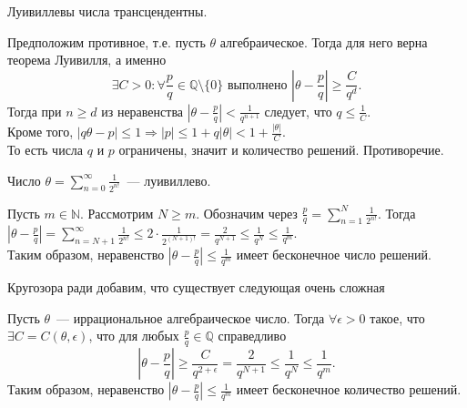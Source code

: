 \begin{proposition} \label{l9_prp}
	Луивиллевы числа трансцендентны.
\end{proposition}
\begin{pf}
	Предположим противное, т.е. пусть $\theta$ алгебраическое. Тогда для него верна теорема Луивилля, а именно
	$$\exists C > 0:  \forall  \frac{p}{q} \in \mathbb{Q} \setminus \lbrace 0 \rbrace \text{ выполнено }  \left|\theta - \frac{p}{q}\right| \geq \frac{C}{q^d}.$$
	Тогда при $n \geq d$ из неравенства $\displaystyle \left|\theta - \frac{p}{q}\right| < \frac{1}{q^{n + 1}}$ следует, что $\displaystyle q \leq \frac{1}{C}$.\\
	Кроме того, $\displaystyle \left|q \theta - p\right| \leq 1 \Rightarrow |p| \leq 1 + q|\theta| < 1 + \frac{|\theta|}{C}.$\\
	То есть числа $q$ и $p$ ограничены, значит и количество решений. Противоречие.
\end{pf}

\begin{example}
	Число $\displaystyle \theta = \sum_{n = 0}^{\infty} \frac{1}{2^{n!}}$ — луивиллево.
\end{example}
\begin{pf}
	Пусть $m \in \mathbb{N}$. Рассмотрим $N \geq m$. Обозначим через $\displaystyle \frac{p}{q} = \sum_{n = 1}^{N} \frac{1}{2^{n!}}$. Тогда $\displaystyle \left| \theta - \frac{p}{q} \right| = \sum_{n = N + 1}^{\infty} \frac{1}{2^{n!}} \leq 2 \cdot \frac{1}{2^{(N+1)!}} = \frac{2}{q^{N + 1}} \leq \frac{1}{q^N} \leq \frac{1}{q^m}$.\\
	Таким образом, неравенство $\displaystyle \left| \theta - \frac{p}{q} \right| \leq \frac{1}{q^m}$ имеет бесконечное число решений.
\end{pf}

Кругозора ради добавим, что существует следующая очень сложная

\begin{theorem}
	Пусть $\theta$ — иррациональное алгебраическое число. Тогда $\forall \epsilon > 0$ такое, что $\exists C = C(\theta, \epsilon)$, что для любых $\frac{p}{q} \in \mathbb{Q}$ справедливо
	$$\left|\theta - \frac{p}{q}\right| \geq \frac{C}{q^{2 + \epsilon}} = \frac{2}{q^{N+1}} \leq \frac{1}{q^N} \leq \frac{1}{q^m}.$$
	Таким образом, неравенство $\displaystyle \left|\theta - \frac{p}{q}\right| \leq \frac{1}{q^m}$ имеет бесконечное количество решений.
\end{theorem}~\\

